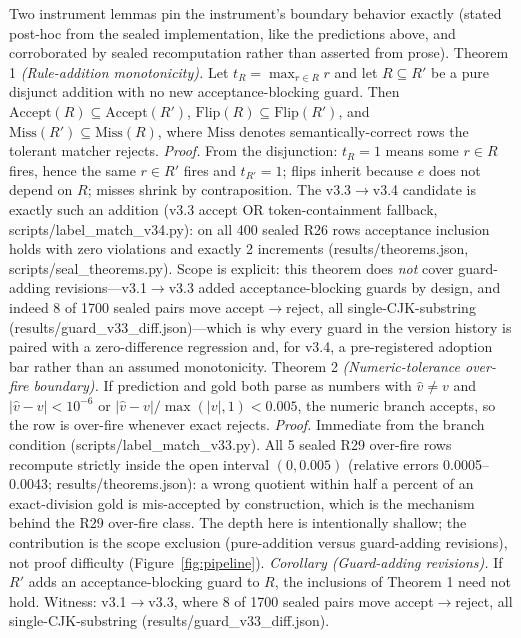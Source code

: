 \documentclass[10pt]{article} %
\begin{document}
Two instrument lemmas pin the instrument's boundary behavior exactly (stated post-hoc from the sealed implementation, like the predictions above, and corroborated by sealed recomputation rather than asserted from prose). Theorem 1 \emph{(Rule-addition monotonicity).} Let $t_R=\max_{r\in R}r$ and let $R\subseteq R'$ be a pure disjunct addition with no new acceptance-blocking guard. Then $\mathrm{Accept}(R)\subseteq\mathrm{Accept}(R')$, $\mathrm{Flip}(R)\subseteq\mathrm{Flip}(R')$, and $\mathrm{Miss}(R')\subseteq\mathrm{Miss}(R)$, where $\mathrm{Miss}$ denotes semantically-correct rows the tolerant matcher rejects. \emph{Proof.} From the disjunction: $t_R=1$ means some $r\in R$ fires, hence the same $r\in R'$ fires and $t_{R'}=1$; flips inherit because $e$ does not depend on $R$; misses shrink by contraposition. The v3.3$\to$v3.4 candidate is exactly such an addition (v3.3 accept OR token-containment fallback, scripts/label\_match\_v34.py): on all 400 sealed R26 rows acceptance inclusion holds with zero violations and exactly 2 increments (results/theorems.json, scripts/seal\_theorems.py). Scope is explicit: this theorem does \emph{not} cover guard-adding revisions---v3.1$\to$v3.3 added acceptance-blocking guards by design, and indeed 8 of 1700 sealed pairs move accept$\to$reject, all single-CJK-substring (results/guard\_v33\_diff.json)---which is why every guard in the version history is paired with a zero-difference regression and, for v3.4, a pre-registered adoption bar rather than an assumed monotonicity. Theorem 2 \emph{(Numeric-tolerance over-fire boundary).} If prediction and gold both parse as numbers with $\hat v\ne v$ and $|\hat v-v|<10^{-6}$ or $|\hat v-v|/\max(|v|,1)<0.005$, the numeric branch accepts, so the row is over-fire whenever exact rejects. \emph{Proof.} Immediate from the branch condition (scripts/label\_match\_v33.py). All 5 sealed R29 over-fire rows recompute strictly inside the open interval $(0,0.005)$ (relative errors 0.0005--0.0043; results/theorems.json): a wrong quotient within half a percent of an exact-division gold is mis-accepted by construction, which is the mechanism behind the R29 over-fire class. The depth here is intentionally shallow; the contribution is the scope exclusion (pure-addition versus guard-adding revisions), not proof difficulty (Figure~\ref{fig:pipeline}). \emph{Corollary (Guard-adding revisions).} If $R'$ adds an acceptance-blocking guard to $R$, the inclusions of Theorem 1 need not hold. Witness: v3.1$\to$v3.3, where 8 of 1700 sealed pairs move accept$\to$reject, all single-CJK-substring (results/guard\_v33\_diff.json).
\end{document}
